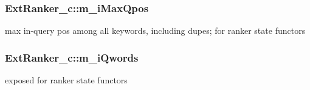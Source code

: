 \hypertarget{classExtRanker__c_af62a7edce26552cb1b38b8d99b80b58a}{
\subsubsection[{m\-\_\-i\-Max\-Qpos}]{ Ext\-Ranker\-\_\-c\-::m\-\_\-i\-Max\-Qpos}}\label{classExtRanker__c_af62a7edce26552cb1b38b8d99b80b58a}


max in-\/query pos among all keywords, including dupes; for ranker state functors 

\hypertarget{classExtRanker__c_a99c1bf3bd52c6a8dc25830b1c6a7ba62}{
\subsubsection[{m\-\_\-i\-Qwords}]{ Ext\-Ranker\-\_\-c\-::m\-\_\-i\-Qwords}}\label{classExtRanker__c_a99c1bf3bd52c6a8dc25830b1c6a7ba62}


exposed for ranker state functors 

